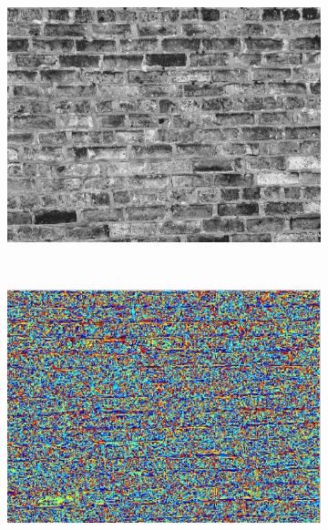 \documentclass[10pt,twocolumn,letterpaper]{article}
\begin{document}
\begin{figure}
\begin{subfigure}[b]{0.2\textwidth}
        \includegraphics[width=\textwidth]{T14_01.jpg}
    \end{subfigure}
    ~ 
    \begin{subfigure}[b]{0.2\textwidth}
        \includegraphics[width=\textwidth]{T14_D01.eps}
    \end{subfigure}
    ~ 
    \begin{subfigure}[b]{0.2\textwidth}

\end{subfigure}
\end{figure}
\end{document}
